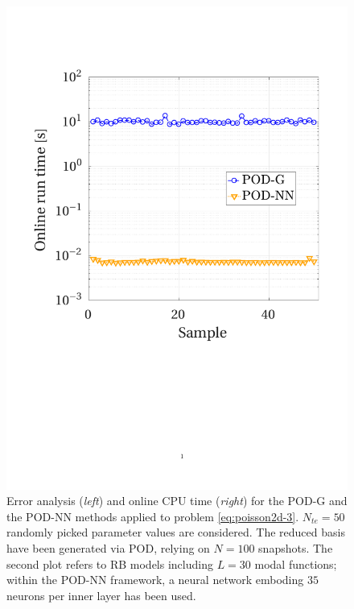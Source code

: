 \documentclass[12pt, a4paper, twoside, openright, notitlepage]{report}
\numberwithin{equation}{chapter}
\theoremstyle{theorem}
\theoremstyle{definition}
\theoremstyle{remark}
\theoremstyle{proposition}
\numberwithin{figure}{chapter}
\begin{document}
\begin{figure}[H]
			\includegraphics[scale = 0.41, trim = {1.5cm 8.9cm 1.5cm 3.8cm}, clip]{poisson2d_3_time}
			
			\caption{Error analysis (\emph{left}) and online CPU time (\emph{right}) for the POD-G and the POD-NN methods applied to problem \eqref{eq:poisson2d-3}. $N_{te} = 50$ randomly picked parameter values are considered. The reduced basis have been generated via POD, relying on $N = 100$ snapshots. The second plot refers to RB models including $L = 30$ modal functions; within the POD-NN framework, a neural network emboding $35$ neurons per inner layer has been used.}
			\label{fig:poisson2d-3-fig2}
		\end{figure}
		
		\vspace*{-0.2cm}
		
\end{document}
